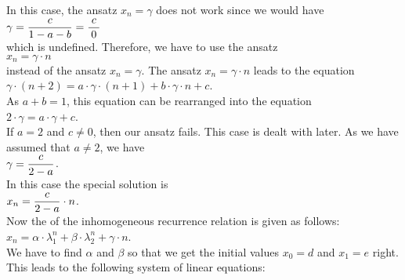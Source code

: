 \begin{enumerate}
\begin{enumerate}
            In this case, the ansatz $x_n = \gamma$ does not work since we would have
            \\[0.2cm]
            \hspace*{1.3cm}
            $\displaystyle \gamma = \frac{c}{1 - a - b} = \frac{\;c\;}{0}$
            \\[0.2cm]
            which is undefined.  Therefore, we have to use the ansatz
            \\[0.2cm]
            \hspace*{1.3cm}
            $x_n = \gamma \cdot n$           
            \\[0.2cm]
            instead of the ansatz $x_n = \gamma$.  The ansatz $x_n = \gamma \cdot n$ leads to the equation
            \\[0.2cm]
            \hspace*{1.3cm}
            $\gamma \cdot (n+2) = a \cdot \gamma \cdot (n+1) + b \cdot \gamma \cdot n + c$.
            \\[0.2cm]
            As $a + b = 1$, this equation can be rearranged into the equation
            \\[0.2cm]
            \hspace*{1.3cm}
            $2 \cdot \gamma = a \cdot \gamma + c$.
            \\[0.2cm]
            If $a = 2$ and $c \not= 0$, then our ansatz fails.  This case is dealt with later.
            As we have assumed that $a \not= 2$, we have 
            \\[0.2cm]
            \hspace*{1.3cm}
            $\displaystyle \gamma = \frac{c}{2 - a}$.
            \\[0.2cm]
            In this case the special solution is
            \\[0.2cm]
            \hspace*{1.3cm}
            $\displaystyle x_n = \frac{c}{2 - a} \cdot n$.
            \\[0.2cm]
            Now the  of the inhomogeneous recurrence relation is given as follows:
            \\[0.2cm]
            \hspace*{1.3cm}
            $x_n = \alpha \cdot \lambda_1^n + \beta \cdot \lambda_2^n + \gamma \cdot n$.
            \\[0.2cm]
            We have to find $\alpha$ and $\beta$ so that we get the initial values $x_0 = d$ and $x_1 = e$ right.
            This leads to the following system of linear equations:

\end{enumerate}
\end{enumerate}
